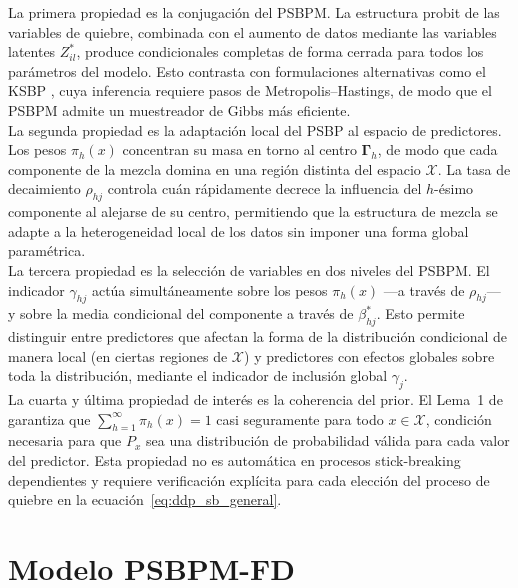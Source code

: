 La primera propiedad es la conjugación del PSBPM. La estructura probit de las variables de quiebre, combinada con el aumento de datos mediante las variables latentes $Z_{il}^*$, produce condicionales completas de forma cerrada para todos los parámetros del modelo. Esto contrasta con formulaciones alternativas como el KSBP \citep{02_06_dunson2008kernel}, cuya inferencia requiere pasos de Metropolis--Hastings, de modo que el PSBPM admite un muestreador de Gibbs más eficiente.\\

La segunda propiedad es la adaptación local del PSBP al espacio de predictores. Los pesos $\pi_h(x)$ concentran su masa en torno al centro $\boldsymbol{\Gamma}_h$, de modo que cada componente de la mezcla domina en una región distinta del espacio $\mathcal{X}$. La tasa de decaimiento $\rho_{hj}$ controla cuán rápidamente decrece la influencia del $h$-ésimo componente al alejarse de su centro, permitiendo que la estructura de mezcla se adapte a la heterogeneidad local de los datos sin imponer una forma global paramétrica.\\
 
La tercera propiedad es la selección de variables en dos niveles del PSBPM. El indicador $\gamma_{hj}$ actúa simultáneamente sobre los pesos $\pi_h(x)$ ---a través de $\rho_{hj}$--- y sobre la media condicional del componente a través de $\beta_{hj}^*$. Esto permite distinguir entre predictores que afectan la forma de la distribución condicional de manera local (en ciertas regiones de $\mathcal{X}$) y predictores con efectos globales sobre toda la distribución, mediante el indicador de inclusión global $\gamma_j$.\\
 
La cuarta y última propiedad de interés es la coherencia del prior. El Lema~1 de \citet{03_02_chung2009nonparametric} garantiza que $\sum_{h=1}^{\infty}\pi_h(x) = 1$ casi seguramente para todo $x \in \mathcal{X}$, condición necesaria para que $P_x$ sea una distribución de probabilidad válida para cada valor del predictor. Esta propiedad no es automática en procesos stick-breaking dependientes y requiere verificación explícita para cada elección del proceso de quiebre en la ecuación~\eqref{eq:ddp_sb_general}.
 
\section{Modelo PSBPM-FD}
\label{03_04_00_modelo_propuesto_psbpm_fd}

